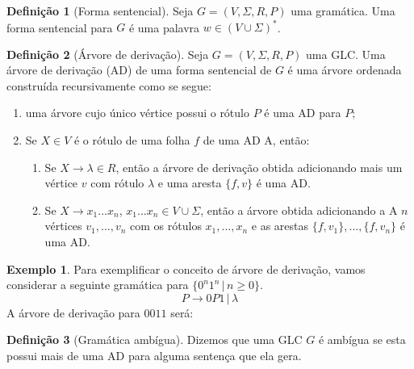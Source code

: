 \documentclass[a4paper]{article}
\theoremstyle{definition}
\newtheorem{Example}{Exemplo}
\newtheorem{Definition}{Definição}
\begin{document}
  \begin{Definition}[Forma sentencial]
    Seja $G = (V,\Sigma,R,P)$ uma gramática. Uma forma sentencial para $G$ é uma
    palavra $w \in (V\cup\Sigma)^*$.
  \end{Definition}

  \begin{Definition}[Árvore de derivação]
    Seja $G = (V,\Sigma,R,P)$ uma GLC. Uma árvore de derivação (AD) de uma forma
    sentencial de $G$ é uma árvore ordenada construída recursivamente como se
    segue:
    \begin{enumerate}
      \item uma árvore cujo único vértice possui o rótulo $P$ é uma AD para $P$;
      \item Se $X \in V$ é o rótulo de uma folha $f$ de uma AD A, então:
        \begin{enumerate}
           \item Se $X \to \lambda \in R$, então a árvore de derivação obtida
             adicionando mais um vértice $v$ com rótulo $\lambda$ e uma aresta
             $\{f,v\}$ é uma AD.
           \item Se $X \to x_1...x_n$, $x_1...x_n\in V \cup \Sigma$, então a
             árvore obtida adicionando a A $n$ vértices $v_1,...,v_n$ com os
             rótulos $x_1,...,x_n$ e as arestas $\{f,v_1\},...,\{f,v_n\}$
             é uma AD.
        \end{enumerate}
    \end{enumerate}
  \end{Definition}

  \begin{Example}
    Para exemplificar o conceito de árvore de derivação, vamos considerar a
    seguinte gramática para $\{0^n1^n\,|\,n\geq 0\}$.
    \[
      P \to 0P1\,|\,\lambda
    \]
    A árvore de derivação para $0011$ será:
    \begin{figure}[H]
      \centering
    \end{figure}
  \end{Example}


  \begin{Definition}[Gramática ambígua]
    Dizemos que uma GLC $G$ é ambígua se esta possui mais de uma AD para alguma
    sentença que ela gera.
  \end{Definition}
\end{document}
